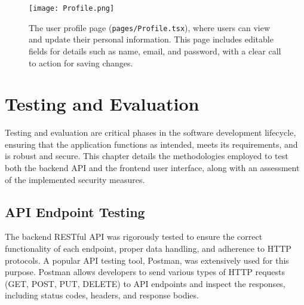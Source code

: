 \documentclass{report}
\begin{document}
\begin{figure}[htbp]
    \centering
    \texttt{[image: Profile.png]} %
    \caption{The user profile page (\texttt{pages/Profile.tsx}), where users can view and update their personal information. This page includes editable fields for details such as name, email, and password, with a clear call to action for saving changes.}
    \label{fig:user_profile_page}
\end{figure}

\chapter{Testing and Evaluation}
\label{chap:testing_evaluation}
Testing and evaluation are critical phases in the software development lifecycle, ensuring that the application functions as intended, meets its requirements, and is robust and secure. This chapter details the methodologies employed to test both the backend API and the frontend user interface, along with an assessment of the implemented security measures.

\section{API Endpoint Testing}
\label{sec:api_endpoint_testing}
The backend RESTful API was rigorously tested to ensure the correct functionality of each endpoint, proper data handling, and adherence to HTTP protocols. A popular API testing tool, Postman, was extensively used for this purpose. Postman allows developers to send various types of HTTP requests (GET, POST, PUT, DELETE) to API endpoints and inspect the responses, including status codes, headers, and response bodies.
\end{document}
